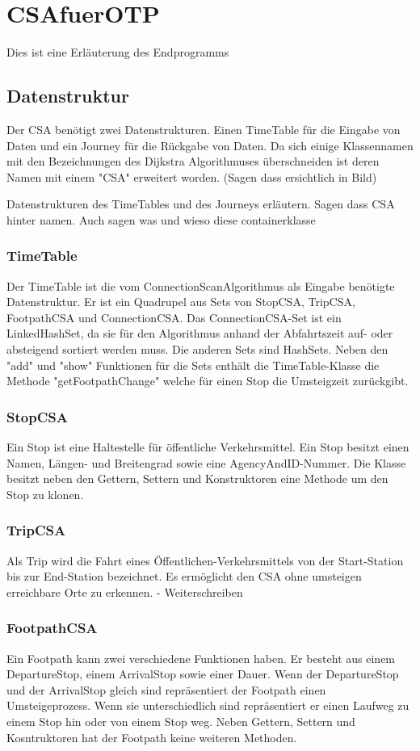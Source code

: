 \section{CSAfuerOTP}
Dies ist eine Erläuterung des Endprogramms

\subsection{Datenstruktur}
Der CSA benötigt zwei Datenstrukturen. Einen TimeTable für die Eingabe von Daten und ein Journey für die Rückgabe von Daten. Da sich einige Klassennamen mit den Bezeichnungen des Dijkstra Algorithmuses überschneiden ist deren Namen mit einem "CSA"  erweitert worden. (Sagen dass ersichtlich in Bild)

Datenstrukturen des TimeTables und des Journeys erläutern. Sagen dass CSA hinter namen. Auch sagen was und wieso diese containerklasse

\subsubsection{TimeTable}
Der TimeTable ist die vom ConnectionScanAlgorithmus als Eingabe benötigte Datenstruktur. Er ist ein Quadrupel aus Sets von StopCSA, TripCSA, FootpathCSA und ConnectionCSA. Das ConnectionCSA-Set ist ein LinkedHashSet, da sie für den Algorithmus anhand der Abfahrtszeit auf- oder absteigend sortiert werden muss. Die anderen Sets sind HashSets. Neben den "add" und "show" Funktionen für die Sets enthält die TimeTable-Klasse die Methode "getFootpathChange" welche für einen Stop die Umsteigzeit zurückgibt.

\subsubsection{StopCSA}
Ein Stop ist eine Haltestelle für öffentliche Verkehrsmittel. Ein Stop besitzt einen Namen, Längen- und Breitengrad sowie eine AgencyAndID-Nummer. Die Klasse besitzt neben den Gettern, Settern und Konstruktoren eine Methode um den Stop zu klonen. 

\subsubsection{TripCSA}
Als Trip wird die Fahrt eines Öffentlichen-Verkehrsmittels von der Start-Station bis zur End-Station bezeichnet. Es ermöglicht den CSA ohne umsteigen erreichbare Orte zu erkennen.
- Weiterschreiben

\subsubsection{FootpathCSA}
Ein Footpath kann zwei verschiedene Funktionen haben. Er besteht aus einem DepartureStop, einem ArrivalStop sowie einer Dauer. Wenn der DepartureStop und der ArrivalStop gleich sind repräsentiert der Footpath einen Umsteigeprozess. Wenn sie unterschiedlich sind repräsentiert er einen Laufweg zu einem Stop hin oder von einem Stop weg. Neben Gettern, Settern und Kosntruktoren hat der Footpath keine weiteren Methoden.

